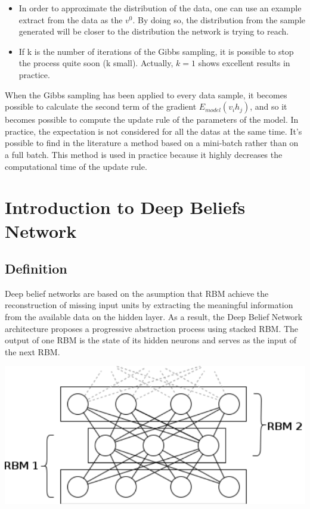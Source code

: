 \documentclass{report}
\begin{document}
	\begin{itemize} 
	
		\item In order to approximate the distribution of the data, one can use an 
	example extract from the data as the $v^0$. By doing so, the distribution from 
	the sample generated will be closer to the distribution the network is trying 
	to reach. 
	
		\item If k is the number of iterations of the Gibbs sampling, it is possible to 
	stop the process quite soon (k small). Actually, $k=1$ shows excellent results 
	in practice. 
	
	\end{itemize}
	When the Gibbs sampling has been applied to every data sample, it becomes 
	possible to calculate the second term of the gradient $E_{model}(v_i h_j)$, and 
	so it becomes possible to compute the update rule of the parameters of the 
	model. In practice, the expectation is not considered for all the datas at the 
	same time. It's possible to find in the literature 
	\cite{hinton2010practical} a method based on a mini-batch rather than on 
	a full batch. This method is used in practice because it highly decreases the 
	computational time of the update rule.
	
	\section{Introduction to Deep Beliefs Network}
	
	\subsection{Definition}
	
	Deep belief networks are based on the asumption that RBM achieve the 
	reconstruction of missing input units by extracting the meaningful information 
	from the available data on the hidden layer. As a result, the Deep Belief 
	Network architecture  proposes a progressive abstraction process using stacked 
	RBM. The output of one RBM is the state of its hidden neurons and serves as the 
	input of the next RBM.
	
	\vspace{0.5cm}
	\begin{center}
		\includegraphics{ressources/dbn}
	\end{center}
	\vspace{0.5cm}
	
\end{document}
